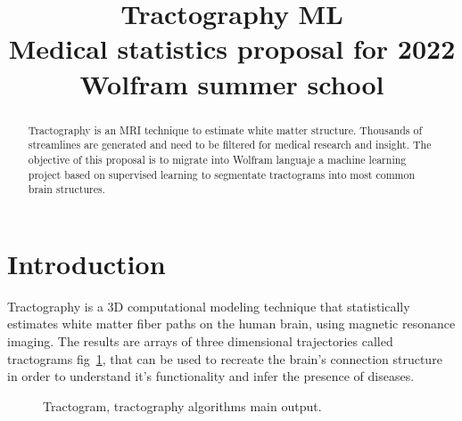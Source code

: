 \documentclass[conference]{IEEEtran}
\begin{document}
\title{
Tractography ML  \\
{\footnotesize Medical statistics proposal for 2022 Wolfram summer school}
}

\author{
}

\maketitle

\begin{abstract}
    Tractography is an MRI technique to estimate white matter structure. Thousands of streamlines are generated and need to be filtered for medical research and insight. The objective of this proposal is to migrate into Wolfram languaje a machine learning project based on supervised learning to segmentate tractograms into most common brain structures.
\end{abstract}

%
%
\section{Introduction}
Tractography is a 3D computational modeling technique that statistically estimates white matter fiber paths on the human brain, using magnetic resonance imaging. The results are arrays of three dimensional trajectories called tractograms fig~\ref{tractogram}, that can be used to recreate the brain's connection structure in order to understand it's functionality and infer the presence of diseases.

\begin{figure}[htbp]
    \centerline{
    }
    \caption{Tractogram, tractography algorithms main output.}
    \label{tractogram}
\end{figure}
\end{document}
